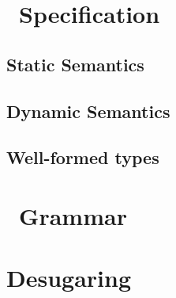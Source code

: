 \section{\lang\ Specification}

%
\subsection{Static Semantics}\label{subsec:static_sem}
\ottdefnsTypes%

\subsection{Dynamic Semantics}\label{subsec:dyn_sem}
\ottdefnsOpXXSem%

\clearpage






\subsection{Well-formed types}
\ottdefnsWellXXFormed%

\section{\lang\ Grammar}\label{sec:grammar_def}
\ottgrammar%

\section{Desugaring \lang}\label{sec:lang_desugar}

